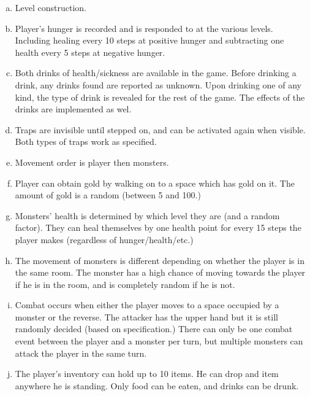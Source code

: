 \documentclass[a4paper,12pt]{article}
\begin{document}
\begin{enumerate} [a)]

  \item Level construction.

  \item Player's hunger is recorded and is responded to at the various
    levels. Including healing every 10 steps at positive hunger and
    subtracting one health every 5 steps at negative hunger.

  \item Both drinks of health/sickness are available in the
    game. Before drinking a drink, any drinks found are reported as
    unknown. Upon drinking one of any kind, the type of drink is
    revealed for the rest of the game. The effects of the drinks are
    implemented as wel.

  \item Traps are invisible until stepped on, and can be activated
    again when visible. Both types of traps work as specified.

  \item Movement order is player then monsters.

  \item Player can obtain gold by walking on to a space which has gold
    on it. The amount of gold is a random (between 5 and 100.)

  \item Monsters' health is determined by which level they are (and a
    random factor). They can heal themselves by one health point for
    every 15 steps the player makes (regardless of hunger/health/etc.)

  \item The movement of monsters is different depending on whether the
    player is in the same room. The monster has a high chance of
    moving towards the player if he is in the room, and is completely
    random if he is not.

  \item Combat occurs when either the player moves to a space occupied
    by a monster or the reverse. The attacker has the upper hand but
    it is still randomly decided (based on specification.) There can
    only be one combat event between the player and a monster per
    turn, but multiple monsters can attack the player in the same
    turn.

  \item The player's inventory can hold up to 10 items. He can drop
    and item anywhere he is standing. Only food can be eaten, and
    drinks can be drunk.


\end{enumerate}
\end{document}
